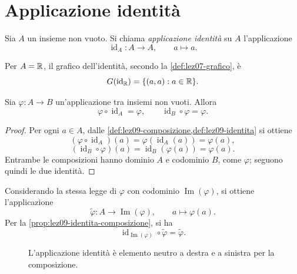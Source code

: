 \section{Applicazione identità}
\label{sec:lez09-identita}

\begin{definition}
\label{def:lez09-identita}
Sia \(A\) un insieme non vuoto. Si chiama
\emph{applicazione identità} su \(A\) l'applicazione
\[
  \operatorname{id}_A\colon A\longrightarrow A,
  \qquad a\longmapsto a.
\]
\end{definition}

Per \(A=\mathbb{R}\), il grafico dell'identità, secondo la
\cref{def:lez07-grafico}, è
\[
  G(\operatorname{id}_{\mathbb{R}})
  =\{(a,a):a\in\mathbb{R}\}.
\]

\begin{proposition}
\label{prop:lez09-identita-composizione}
Sia \(\varphi\colon A\longrightarrow B\) un'applicazione
tra insiemi non vuoti. Allora
\[
  \varphi\circ\operatorname{id}_A=\varphi,
  \qquad
  \operatorname{id}_B\circ\varphi=\varphi.
\]
\end{proposition}

\begin{proof}
Per ogni \(a\in A\), dalle
\cref{def:lez09-composizione,def:lez09-identita} si ottiene
\[
  (\varphi\circ\operatorname{id}_A)(a)
  =\varphi(\operatorname{id}_A(a))=\varphi(a),
\]
\[
  (\operatorname{id}_B\circ\varphi)(a)
  =\operatorname{id}_B(\varphi(a))=\varphi(a).
\]
Entrambe le composizioni hanno dominio \(A\) e codominio
\(B\), come \(\varphi\); seguono quindi le due identità.
\end{proof}

Considerando la stessa legge di \(\varphi\) con codominio
\(\operatorname{Im}(\varphi)\), si ottiene l'applicazione
\[
  \widetilde{\varphi}\colon A\longrightarrow
  \operatorname{Im}(\varphi),
  \qquad a\longmapsto\varphi(a).
\]
Per la \cref{prop:lez09-identita-composizione}, si ha
\[
  \operatorname{id}_{\operatorname{Im}(\varphi)}
  \circ\widetilde{\varphi}=\widetilde{\varphi}.
\]

\begin{figure}[H]
  \centering
  
  \caption{L'applicazione identità è elemento neutro
  a destra e a sinistra per la composizione.}
  \label{fig:lez09-identita-composizione}
\end{figure}

\clearpage

